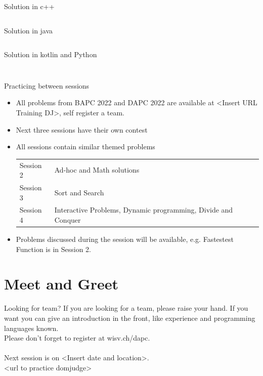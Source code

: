 \documentclass[11pt,pdf, aspectratio=169]{beamer}
\begin{document}
  \begin{frame}[containsverbatim]{Solution in c++}
    \inputminted{c++}{code/session-1/c++/dapc-f.cpp}
  \end{frame}
  \begin{frame}[containsverbatim]{Solution in java}
    \inputminted{java}{code/session-1/java/dapc-f.java}
  \end{frame}
  \begin{frame}[containsverbatim]{Solution in kotlin and Python}
    \inputminted{kotlin}{code/session-1/kotlin/dapc-f.kt}
    \inputminted{python}{code/session-1/python/dapc-f.py}
  \end{frame}
  \begin{frame}{Practicing between sessions}
    \begin{itemize}
      \item All problems from BAPC 2022 and DAPC 2022 are available at <Insert URL Training DJ>, self register a team.
      \item Next three sessions have their own contest
      \item All sessions contain similar themed problems\\ \begin{tabular}{ll}
                                                             \hline
                                                             Session 2 & Ad-hoc and Math solutions                                     \\
                                                             Session 3 & Sort and Search                                               \\
                                                             Session 4 & Interactive Problems, Dynamic programming, Divide and Conquer \\
                                                             \hline
      \end{tabular}
      \item Problems discussed during the session will be available, e.g. Fastestest Function is in Session 2.
    \end{itemize}
  \end{frame}
  \section{Meet and Greet}
  \begin{frame}{Looking for team?}
    If you are looking for a team, please raise your hand.
    If you want you can give an introduction in the front, like experience and programming languages known.\\
    Please don't forget to register at wisv.ch/dapc.\\\\
    Next session is on <Insert date and location>.\\

    <url to practice domjudge>
  \end{frame}
\end{document}
